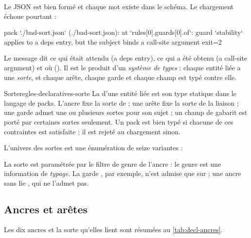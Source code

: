 Le JSON est bien formé et chaque mot existe dans le schéma. Le chargement échoue pourtant :

\begin{sortie}
[error] pack `./bad-sort.json` (./bad-sort.json): at `rules[0].guards[0].of`: guard `stability` applies to a deps entry, but the subject binds a call-site argument
exit=2
\end{sortie}

Le message dit ce qui était attendu (\og a deps entry\fg{}), ce qui a été obtenu (\og a call-site argument\fg{}) et où (). Il est le produit d'un \emph{système de types} : chaque entité liée a une \emph{sorte}, et chaque arête, chaque garde et chaque champ est typé contre elle.

\begin{definition}{Sorte}{regles-declaratives-sorte}
La  d'une entité liée est son type statique dans le langage de packs. L'ancre fixe la sorte de  ; une arête  fixe la sorte de la liaison ; une garde admet une ou plusieurs sortes pour son sujet  ; un champ de gabarit est porté par certaines sortes seulement. Un pack est bien typé si chacune de ces contraintes est satisfaite ; il est rejeté au chargement sinon.
\end{definition}

L'univers des sortes est une énumération de seize variantes :


La sorte  est paramétrée par le filtre de genre de l'ancre : le genre est une information de \emph{typage}. La garde , par exemple, n'est admise que sur  ; une ancre  sans  lie , qui ne l'admet pas.

\subsection{Ancres et arêtes}

Les dix ancres et la sorte qu'elles lient sont résumées au \cref{tab:decl-ancres}.


